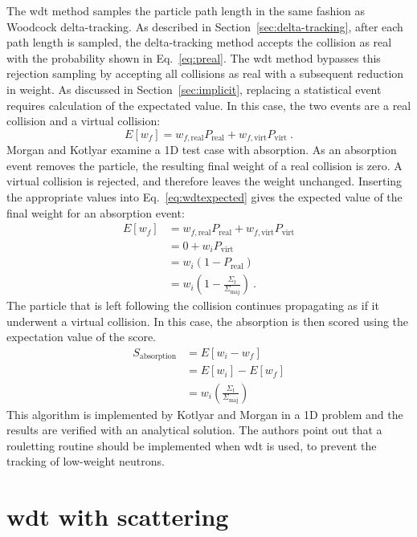The \gls{wdt} method samples the particle path length in the same fashion as
Woodcock delta-tracking. As described in Section~\ref{sec:delta-tracking},
after each path length is sampled, the delta-tracking method accepts the
collision as real with the probability shown in
Eq.~\ref{eq:preal}. The \gls{wdt} method bypasses this rejection sampling by
accepting all collisions as real with a subsequent reduction in
weight. As discussed in Section~\ref{sec:implicit}, replacing a
statistical event requires calculation of the expectated value. In
this case, the two events are a real collision and a virtual
collision:
\begin{equation}
  \label{eq:wdtexpected}
  E[w_f] = w_{f,\mathrm{real}}P_{\mathrm{real}} + w_{f,\mathrm{virt}}P_{\mathrm{virt}}\:.
\end{equation}
Morgan and Kotlyar examine a 1D test case with absorption. As an
absorption event removes the particle, the resulting final weight of a
real collision is zero. A virtual collision is rejected, and therefore
leaves the weight unchanged. Inserting the appropriate values into
Eq.~\eqref{eq:wdtexpected} gives the expected value of the final
weight for an absorption event:
\begin{align*}
  \label{eq:mkexpected}
  E[w_f] &= w_{f,\mathrm{real}}P_{\mathrm{real}} +
           w_{f,\mathrm{virt}}P_{\mathrm{virt}} \\
  &= 0 + w_iP_{\mathrm{virt}} \\
  &= w_i(1-P_\mathrm{real}) \\
  &= w_i\left(1-\frac{\Sigma_t}{\Sigma_\mathrm{maj}}\right)\:.
\end{align*}
The particle that is left following the collision continues propagating
as if it underwent a virtual collision. In this case, the absorption
is then scored using the expectation value of the score.
\begin{align*}
  S_\mathrm{absorption} &= E[w_i - w_f] \\
  &= E[w_i] - E[w_f] \\
  &= w_i\left(\frac{\Sigma_t}{\Sigma_\mathrm{maj}}\right)
\end{align*}
This algorithm is implemented by Kotlyar and Morgan in a 1D problem and the
results are verified with an analytical solution. The authors point
out that a rouletting routine should be implemented when \gls{wdt} is used,
to prevent the tracking of low-weight neutrons.

\section{\Acrlong{wdt} with scattering}
\label{sec:wdt_scattering}


